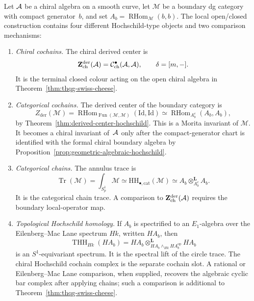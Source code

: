 \begin{theorem}
\label{thm:thqg-hochschild-register-separation}
Let $\mathcal{A}$ be a chiral algebra on a smooth curve, let
$\mathcal{M}$ be a boundary dg category with compact generator~$b$,
and set $A_b=\operatorname{RHom}_{\mathcal{M}}(b,b)$. The local
open/closed construction contains four different Hochschild-type
objects and two comparison mechanisms:
\begin{enumerate}[label=\textup{(\roman*)}]
\item \emph{Chiral cochains.}
 The chiral derived center is
 \[
 \mathbf{Z}^{\mathrm{der}}_{\mathrm{ch}}(\mathcal{A})
 =
 \mathcal{C}^{\bullet}_{\mathrm{ch}}(\mathcal{A},\mathcal{A}),
 \qquad
 \delta=[m,-].
 \]
 It is the terminal closed colour acting on the open chiral algebra
 in Theorem~\ref{thm:thqg-swiss-cheese}.

\item \emph{Categorical cochains.}
 The derived center of the boundary category is
 \[
 Z_{\mathrm{der}}(\mathcal{M})
 =
 \operatorname{RHom}_{\operatorname{Fun}(\mathcal M,\mathcal M)}
 (\mathrm{Id},\mathrm{Id})
 \simeq
 \operatorname{RHom}_{A_b^e}(A_b,A_b),
 \]
 by Theorem~\ref{thm:derived-center-hochschild}. This is a Morita
 invariant of $\mathcal M$. It becomes a chiral invariant of~$\mathcal{A}$
 only after the compact-generator chart is identified with the
 formal chiral boundary algebra by
 Proposition~\ref{prop:geometric-algebraic-hochschild}.

\item \emph{Categorical chains.}
 The annulus trace is
 \[
 \operatorname{Tr}(\mathcal M)
 =
 \int_{S^1_p}\mathcal M
 \simeq
 \mathrm{HH}_{\bullet,\mathrm{cat}}(\mathcal M)
 \simeq
 A_b\otimes^{\mathbf L}_{A_b^e}A_b .
 \]
 It is the categorical chain trace. A comparison to
 $\mathbf{Z}^{\mathrm{der}}_{\mathrm{ch}}(\mathcal{A})$ requires the
 boundary local-operator map.

\item \emph{Topological Hochschild homology.}
 If $A_b$ is spectrified to an $E_1$-algebra over the
 Eilenberg--Mac Lane spectrum $Hk$, written $H A_b$, then
 \[
 \operatorname{THH}_{Hk}(H A_b)
 =
 H A_b
 \otimes^{\mathbf L}_{H A_b\wedge_{Hk}H A_b^{\mathrm{op}}}
 H A_b
 \]
 is an $S^1$-equivariant spectrum. It is the spectral lift of the
 circle trace. The chiral Hochschild cochain complex is the separate
 cochain slot. A rational or Eilenberg--Mac Lane comparison, when
 supplied, recovers the algebraic cyclic bar complex after applying
 chains; such a comparison is additional to
 Theorem~\ref{thm:thqg-swiss-cheese}.


\end{enumerate}
\end{theorem}
